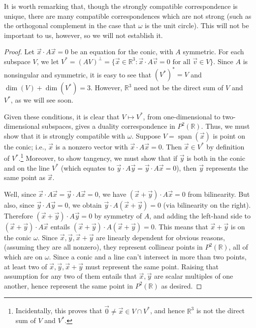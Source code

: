 \documentclass[leqno]{book}
\begin{document}
\noindent It is worth remarking that, though the strongly compatible correspondence is unique, there are many compatible correspondences which are not strong (such as the orthogonal complement in the case that $\omega$ is the unit circle).  This will not be important to us, however, so we will not establish it.
\begin{proof}
Let $\vec x\cdot A\vec x=0$ be an equation for the conic, with $A$ symmetric.  For each subspace $V$, we let $V^*=(AV)^\perp=\{\vec x\in\mathbb R^3:\vec x\cdot A\vec v=0\text{ for all }\vec v\in V\}$.  Since $A$ is nonsingular and symmetric, it is easy to see that $(V^*)^*=V$ and $\dim(V)+\dim(V^*)=3$.  However, $\mathbb R^3$ need not be the direct sum of $V$ and $V^*$, as we will see soon.

Given these conditions, it is clear that $V\mapsto V^*$, from one-dimensional to two-dimensional subspaces, gives a duality correspondence in $P^2(\mathbb R)$.  Thus, we must show that it is strongly compatible with $\omega$.  Suppose $V=\operatorname{span}(\vec x)$ is point on the conic; i.e., $\vec x$ is a nonzero vector with $\vec x\cdot A\vec x=0$.  Then $\vec x\in V^*$ by definition of $V^*$.\footnote{Incidentally, this proves that $\vec 0\ne\vec x\in V\cap V^*$, and hence $\mathbb R^3$ is not the direct sum of $V$ and $V^*$.}  Moreover, to show tangency, we must show that if $\vec y$ is both in the conic and on the line $V^*$ (which equates to $\vec y\cdot A\vec y=\vec y\cdot A\vec x=0$), then $\vec y$ represents the same point as $\vec x$.

Well, since $\vec x\cdot A\vec x=\vec y\cdot A\vec x=0$, we have $(\vec x+\vec y)\cdot A\vec x=0$ from bilinearity.  But also, since $\vec y\cdot A\vec y=0$, we obtain $\vec y\cdot A(\vec x+\vec y)=0$ (via bilinearity on the right).  Therefore $(\vec x+\vec y)\cdot A\vec y=0$ by symmetry of $A$, and adding the left-hand side to $(\vec x+\vec y)\cdot A\vec x$ entails $(\vec x+\vec y)\cdot A(\vec x+\vec y)=0$.  This means that $\vec x+\vec y$ is on the conic $\omega$.  Since $\vec x,\vec y,\vec x+\vec y$ are linearly dependent for obvious reasons, (assuming they are all nonzero), they represent collinear points in $P^2(\mathbb R)$, all of which are on $\omega$.  Since a conic and a line can't intersect in more than two points, at least two of $\vec x,\vec y,\vec x+\vec y$ must represent the same point.  Raising that assumption for any two of them entails that $\vec x,\vec y$ are scalar multiples of one another, hence represent the same point in $P^2(\mathbb R)$ as desired.


\end{proof}
\end{document}
